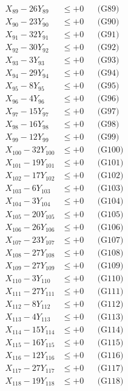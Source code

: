 \documentclass[a4paper,10pt]{article}
\begin{document}
{\begin{align}
X_{89} - 26Y_{89} &\leq +0 && \text{(G89)} \\
X_{90} - 23Y_{90} &\leq +0 && \text{(G90)} \\
X_{91} - 32Y_{91} &\leq +0 && \text{(G91)} \\
X_{92} - 30Y_{92} &\leq +0 && \text{(G92)} \\
X_{93} - 3Y_{93} &\leq +0 && \text{(G93)} \\
X_{94} - 29Y_{94} &\leq +0 && \text{(G94)} \\
X_{95} - 8Y_{95} &\leq +0 && \text{(G95)} \\
\allowbreak
X_{96} - 4Y_{96} &\leq +0 && \text{(G96)} \\
X_{97} - 15Y_{97} &\leq +0 && \text{(G97)} \\
X_{98} - 16Y_{98} &\leq +0 && \text{(G98)} \\
X_{99} - 12Y_{99} &\leq +0 && \text{(G99)} \\
X_{100} - 32Y_{100} &\leq +0 && \text{(G100)} \\
X_{101} - 19Y_{101} &\leq +0 && \text{(G101)} \\
X_{102} - 17Y_{102} &\leq +0 && \text{(G102)} \\
X_{103} - 6Y_{103} &\leq +0 && \text{(G103)} \\
X_{104} - 3Y_{104} &\leq +0 && \text{(G104)} \\
X_{105} - 20Y_{105} &\leq +0 && \text{(G105)} \\
\allowbreak
X_{106} - 26Y_{106} &\leq +0 && \text{(G106)} \\
X_{107} - 23Y_{107} &\leq +0 && \text{(G107)} \\
X_{108} - 27Y_{108} &\leq +0 && \text{(G108)} \\
X_{109} - 27Y_{109} &\leq +0 && \text{(G109)} \\
X_{110} - 3Y_{110} &\leq +0 && \text{(G110)} \\
X_{111} - 27Y_{111} &\leq +0 && \text{(G111)} \\
X_{112} - 8Y_{112} &\leq +0 && \text{(G112)} \\
X_{113} - 4Y_{113} &\leq +0 && \text{(G113)} \\
X_{114} - 15Y_{114} &\leq +0 && \text{(G114)} \\
X_{115} - 16Y_{115} &\leq +0 && \text{(G115)} \\
\allowbreak
X_{116} - 12Y_{116} &\leq +0 && \text{(G116)} \\
X_{117} - 27Y_{117} &\leq +0 && \text{(G117)} \\
X_{118} - 19Y_{118} &\leq +0 && \text{(G118)} \\

\end{align}}
\end{document}
